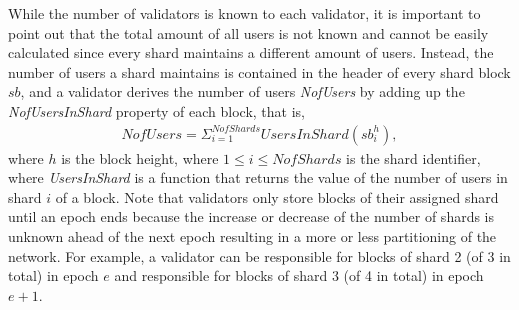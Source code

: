 While the number of validators is known to each validator, it is important to point out that the total amount of all users is not known and cannot be easily calculated since every shard maintains a different amount of users. Instead, the number of users a shard maintains is contained in the header of every shard block $sb$, and a validator derives the number of users \textit{NofUsers} by adding up the \textit{NofUsersInShard} property of each block, that is, 
\begin{gather}
  NofUsers = \Sigma^{NofShards}_{i = 1} UsersInShard(sb^{h}_{i}),
\end{gather}
where $h$ is the block height, where $1 \leq i \leq NofShards$ is the shard identifier, where \textit{UsersInShard} is a function that returns the value of the number of users in shard $i$ of a block. Note that validators only store blocks of their assigned shard until an epoch ends because the increase or decrease of the number of shards is unknown ahead of the next epoch resulting in a more or less partitioning of the network. For example, a validator can be responsible for blocks of shard 2 (of 3 in total) in epoch $e$ and responsible for blocks of shard 3 (of 4 in total) in epoch $e + 1$.
